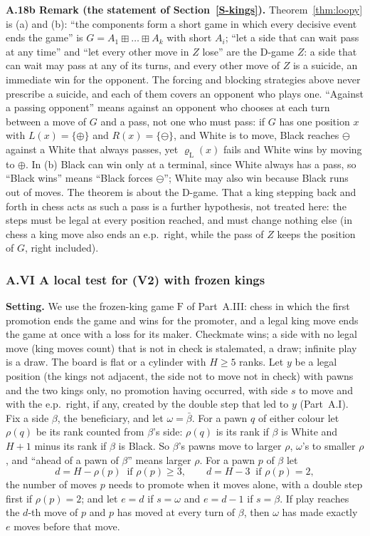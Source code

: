 \textbf{A.18b Remark (the statement of Section~\ref{S-kings}).} Theorem~\ref{thm:loopy} is (a) and (b): ``the
components form a short game in which every decisive event ends the game'' is $G=A_1\boxplus\dots\boxplus A_k$ with short
$A_i$; ``let a side that can wait pass at any time'' and ``let every other move in $Z$ lose'' are the D-game $Z$: a side
that can wait may pass at any of its turns, and every other move of $Z$ is a suicide, an immediate win for the opponent.
The forcing and blocking strategies above never prescribe a suicide, and each of them covers an opponent who plays one.
``Against a passing opponent'' means against an opponent who chooses at each turn between a move of $G$ and a pass, not
one who must pass: if $G$ has one position $x$ with $L(x)=\{\oplus\}$ and $R(x)=\{\ominus\}$, and White is to move, Black
reaches $\ominus$ against a White that always passes, yet $\varrho_{\mathrm L}(x)$ fails and White wins by moving to
$\oplus$. In (b) Black can win only at a terminal, since White always has a pass, so ``Black wins'' means ``Black forces $\ominus$''; White may also win because Black runs out of moves. The theorem is about the
D-game. That a king stepping back and forth in chess acts as such a pass is a further hypothesis, not treated here: the
steps must be legal at every position reached, and must change nothing else (in chess a king move also ends an e.p.\
right, while the pass of $Z$ keeps the position of $G$, right included).

\subsubsection*{A.VI A local test for (V2) with frozen kings}

\textbf{Setting.} We use the frozen-king game $\mathrm{F}$ of Part~A.III: chess in which the first promotion ends the game
and wins for the promoter, and a legal king move ends the game at once with a loss for its maker. Checkmate wins; a side
with no legal move (king moves count) that is not in check is stalemated, a draw; infinite play is a draw. The board is
flat or a cylinder with $H\ge5$ ranks. Let $y$ be a legal position (the kings not adjacent, the side not to move not in
check) with pawns and the two kings only, no promotion having occurred, with side $s$ to move and with the
e.p.\ right, if any, created by the double step that led to $y$ (Part~A.I). Fix a side $\beta$, the beneficiary, and let $\omega=\bar\beta$. For a pawn $q$ of either colour let $\rho(q)$ be its rank counted
from $\beta$'s side: $\rho(q)$ is its rank if $\beta$ is White and $H+1$ minus its rank if $\beta$ is Black. So $\beta$'s
pawns move to larger $\rho$, $\omega$'s to smaller $\rho$, and ``ahead of a pawn of $\beta$'' means larger $\rho$. For a
pawn $p$ of $\beta$ let
\[
d=H-\rho(p)\ \text{ if }\rho(p)\ge3,\qquad d=H-3\ \text{ if }\rho(p)=2,
\]
the number of moves $p$ needs to promote when it moves alone, with a double step first if $\rho(p)=2$; and let $e=d$ if
$s=\omega$ and $e=d-1$ if $s=\beta$. If play reaches the $d$-th move of $p$ and $p$ has moved at every turn of $\beta$,
then $\omega$ has made exactly $e$ moves before that move.

